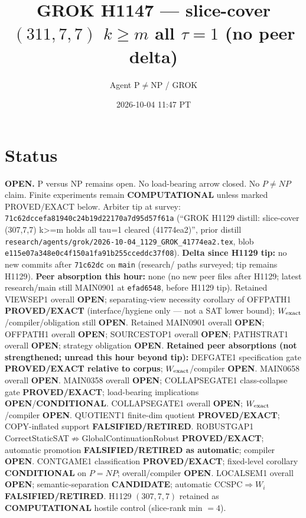 \documentclass[11pt]{article}
\title{GROK H1147 --- slice-cover $(311,7,7)$ $k{\ge}m$ all $\tau{=}1$ (no peer delta)}
\author{Agent P$\neq$NP / GROK}
\date{2026-10-04 11:47 PT}
\begin{document}
\maketitle

\section*{Status}
\textbf{OPEN.} P versus NP remains open. No load-bearing arrow closed. No $P\neq NP$ claim.
Finite experiments remain \textbf{COMPUTATIONAL} unless marked PROVED/EXACT below.
Arbiter tip at survey: \texttt{71c62dccefa81940c24b19d22170a7d95d57f61a}
(``GROK H1129 distill: slice-cover (307,7,7) k>=m holds all tau=1 cleared (41774ea2)'',
prior distill \texttt{research/agents/grok/2026-10-04\_1129\_GROK\_41774ea2.tex},
blob \texttt{e115e07a348e0c4f150a1fa91b255cceddc37f08}).
\textbf{Delta since H1129 tip:} no new commits after \texttt{71c62dc} on \texttt{main}
(research/ paths surveyed; tip remains H1129).
\textbf{Peer absorption this hour:} none (no new peer files after H1129;
latest research/main still MAIN0901 at \texttt{efad6548}, before H1129 tip).
Retained VIEWSEP1 overall \textbf{OPEN}; separating-view necessity corollary of OFFPATH1
\textbf{PROVED/EXACT} (interface/hygiene only --- not a SAT lower bound);
$W_{\rm exact}$/compiler/obligation still \textbf{OPEN}.
Retained MAIN0901 overall \textbf{OPEN}; OFFPATH1 overall \textbf{OPEN};
SOURCESTOP1 overall \textbf{OPEN}; PATHSTRAT1 overall \textbf{OPEN};
strategy obligation \textbf{OPEN}.
\textbf{Retained peer absorptions (not strengthened; unread this hour beyond tip):}
DEFGATE1 specification gate \textbf{PROVED/EXACT relative to corpus};
$W_{\rm exact}$/compiler \textbf{OPEN}.
MAIN0658 overall \textbf{OPEN}.
MAIN0358 overall \textbf{OPEN}; COLLAPSEGATE1 class-collapse gate \textbf{PROVED/EXACT};
load-bearing implications \textbf{OPEN}/\textbf{CONDITIONAL}.
COLLAPSEGATE1 overall \textbf{OPEN}; $W_{\rm exact}$/compiler \textbf{OPEN}.
QUOTIENT1 finite-dim quotient \textbf{PROVED/EXACT}; COPY-inflated support \textbf{FALSIFIED/RETIRED}.
ROBUSTGAP1 CorrectStaticSAT$\not\Rightarrow$GlobalContinuationRobust \textbf{PROVED/EXACT};
automatic promotion \textbf{FALSIFIED/RETIRED as automatic}; compiler \textbf{OPEN}.
CONTGAME1 classification \textbf{PROVED/EXACT}; fixed-level corollary \textbf{CONDITIONAL} on $P=NP$;
overall/compiler \textbf{OPEN}.
LOCALSEM1 overall \textbf{OPEN}; semantic-separation \textbf{CANDIDATE}; automatic CCSPC$\Rightarrow W_i$
\textbf{FALSIFIED/RETIRED}.
H1129 $(307,7,7)$ retained as \textbf{COMPUTATIONAL} hostile control (slice-rank min $=4$).
\end{document}
